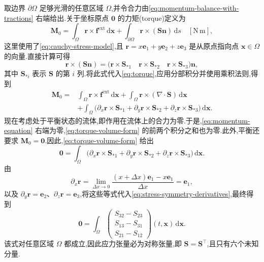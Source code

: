 \begin{note}[应力张量的对称性]\label{note:stress-symmetry}
取边界 $\partial\Omega$ 足够光滑的任意区域 $\Omega$,并令合力由\cref{eq:momentum-balance-with-tractions} 右端给出.关于坐标原点 $\bm{0}$ 的力矩(torque)定义为
\begin{equation}\label{eq:torque}
  \bm{M}_0
  =\int_{\Omega}\bm{r}\times\bm{f}^{\mathrm{ext}}\,\mathrm{d}\bm{x}
   +\int_{\partial\Omega}\bm{r}\times(\bm{S}\bm{n})\,\mathrm{d}s
  \quad[\mathrm{N}\,\mathrm{m}],
\end{equation}
这里使用了\cref{eq:cauchy-stress-model},且 $\bm{r}=x\bm{e}_1+y\bm{e}_2+z\bm{e}_3$ 是从原点指向点 $\bm{x}\in\Omega$ 的向量.直接计算可得
\begin{equation*}
  \bm{r}\times(\bm{S}\bm{n})
  =\bigl(\bm{r}\times\bm{S}_{*1}\quad
         \bm{r}\times\bm{S}_{*2}\quad
         \bm{r}\times\bm{S}_{*3}\bigr)\bm{n},
\end{equation*}
其中 $\bm{S}_{*i}$ 表示 $\bm{S}$ 的第 $i$ 列.将此式代入\cref{eq:torque},应用分部积分并使用乘积法则,得到
\begin{equation}\label{eq:torque-volume-form}
\begin{aligned}
  \bm{M}_0
  ={}&\int_{\Omega}\bm{r}\times\bm{f}^{\mathrm{ext}}\,\mathrm{d}\bm{x}
    +\int_{\Omega}\bm{r}\times(\nabla\cdot\bm{S})\,\mathrm{d}\bm{x}\\
   &+\int_{\Omega}\bigl(\partial_x\bm{r}\times\bm{S}_{*1}
       +\partial_y\bm{r}\times\bm{S}_{*2}
       +\partial_z\bm{r}\times\bm{S}_{*3}\bigr)\,\mathrm{d}\bm{x}.
\end{aligned}
\end{equation}
现在考虑处于平衡状态的流体,即作用在流体上的合力为零.于是,\cref{eq:momentum-equation} 右端为零,\cref{eq:torque-volume-form} 的前两个积分之和也为零.此外,平衡还要求 $\bm{M}_0=\bm{0}$.因此,\cref{eq:torque-volume-form} 给出
\begin{equation}\label{eq:stress-symmetry-derivatives}
  \bm{0}=\int_{\Omega}\bigl(\partial_x\bm{r}\times\bm{S}_{*1}
       +\partial_y\bm{r}\times\bm{S}_{*2}
       +\partial_z\bm{r}\times\bm{S}_{*3}\bigr)\,\mathrm{d}\bm{x}.
\end{equation}
由
\begin{equation*}
  \partial_x\bm{r}
  =\lim_{\Delta x\to0}
    \frac{(x+\Delta x)\bm{e}_1-x\bm{e}_1}{\Delta x}
  =\bm{e}_1,
\end{equation*}
以及 $\partial_y\bm{r}=\bm{e}_2$、$\partial_z\bm{r}=\bm{e}_3$,将这些等式代入\cref{eq:stress-symmetry-derivatives},最终得到
\begin{equation*}
  \bm{0}=\int_{\Omega}
  \begin{pmatrix}
    S_{32}-S_{23}\\S_{13}-S_{31}\\S_{21}-S_{12}
  \end{pmatrix}(t,\bm{x})\,\mathrm{d}\bm{x}.
\end{equation*}
该式对任意区域 $\Omega$ 都成立,因此应力张量必为对称张量,即 $\bm{S}=\bm{S}^{\top}$,且只有六个未知分量.
\end{note}

